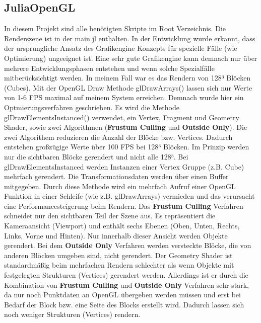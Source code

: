 \documentclass[11pt]{article}
\begin{document}
\subsection{JuliaOpenGL}
In diesem Projekt sind alle benötigten Skripte im Root Verzeichnis. Die Renderszene ist in der main.jl enthalten. In der Entwicklung wurde erkannt, dass der ursprungliche Ansatz des Grafikengine Konzepts für spezielle Fälle (wie Optimierung) ungeeignet ist. Eine sehr gute Grafikengine kann demnach nur über mehrere Entwicklungsphasen entstehen und wenn solche Spezialfälle mitberücksichtigt werden. In meinem Fall war es das Rendern von 128³ Blöcken (Cubes). Mit der OpenGL Draw Methode glDrawArrays() lassen sich nur Werte von 1-6 FPS maximal auf meinem System erreichen. Demnach wurde hier ein Optmierungsverfahren geschrieben. Es wird die Methode glDrawElementsInstanced() verwendet, ein Vertex, Fragment und Geometry Shader, sowie zwei Algorithmen (\textbf{Frustum Culling} und \textbf{Outside Only}). Die zwei Algorithem reduzieren die Anzahl der Blöcke bzw. Vertices. Dadurch entstehen großzügige Werte über 100 FPS bei 128³ Blöcken. Im Prinzip werden nur die sichtbaren Blöcke gerendert und nicht alle 128³. Bei glDrawElementsInstanced werden Instanzen einer Vertex Gruppe (z.B. Cube) mehrfach gerendert. Die Transformationsdaten werden über einen Buffer mitgegeben. Durch diese Methode wird ein mehrfach Aufruf einer OpenGL Funktion in einer Schleife (wie z.B. glDrawArrays) vermieden und das verursacht eine Performancesteigerung beim Rendern.
Das \textbf{Frustum Culling} Verfahren schneidet nur den sichtbaren Teil der Szene aus. Es repräsentiert die Kameraansicht (Viewport) und enthält sechs Ebenen (Oben, Unten, Rechts, Links, Vorne und Hinten). Nur innerhalb dieser Ansicht werden Objekte gerendert.
Bei dem \textbf{Outside Only} Verfahren werden versteckte Blöcke, die von anderen Blöcken umgeben sind, nicht gerendert. Der Geometry Shader ist standardmäßig beim mehrfachen Rendern schlechter als wenn Objekte mit festgelegten Strukturen (Vertices) gerendert werden. Allerdings ist er durch die Kombination von \textbf{Frustum Culling} und \textbf{Outside Only} Verfahren sehr stark, da nur noch Punktdaten an OpenGL übergeben werden müssen und erst bei Bedarf der Block bzw. eine Seite des Blocks erstellt wird. Dadurch lassen sich noch weniger Strukturen (Vertices) rendern.
\end{document}
